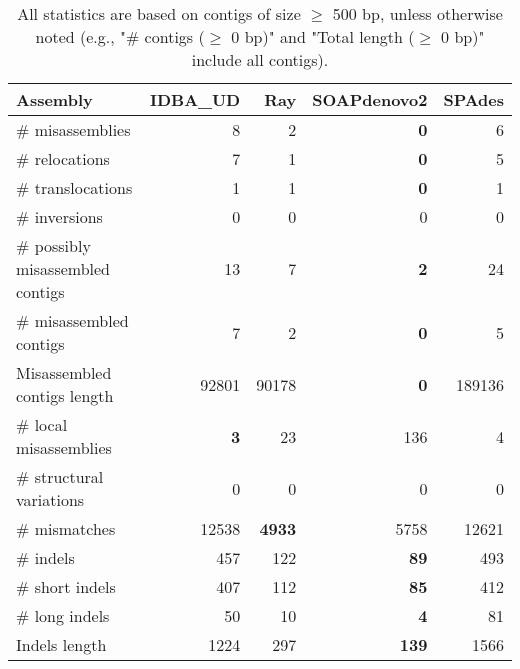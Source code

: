 \documentclass[12pt,a4paper]{article}
\begin{document}
\begin{table}[ht]
\begin{center}
\caption{All statistics are based on contigs of size $\geq$ 500 bp, unless otherwise noted (e.g., "\# contigs ($\geq$ 0 bp)" and "Total length ($\geq$ 0 bp)" include all contigs).}
\begin{tabular}{|l*{4}{|r}|}
\hline
Assembly & IDBA\_UD & Ray & SOAPdenovo2 & SPAdes \\ \hline
\# misassemblies & 8 & 2 & {\bf 0} & 6 \\ \hline
\hspace{5mm}\# relocations & 7 & 1 & {\bf 0} & 5 \\ \hline
\hspace{5mm}\# translocations & 1 & 1 & {\bf 0} & 1 \\ \hline
\hspace{5mm}\# inversions & 0 & 0 & 0 & 0 \\ \hline
\# possibly misassembled contigs & 13 & 7 & {\bf 2} & 24 \\ \hline
\# misassembled contigs & 7 & 2 & {\bf 0} & 5 \\ \hline
Misassembled contigs length & 92801 & 90178 & {\bf 0} & 189136 \\ \hline
\# local misassemblies & {\bf 3} & 23 & 136 & 4 \\ \hline
\# structural variations & 0 & 0 & 0 & 0 \\ \hline
\# mismatches & 12538 & {\bf 4933} & 5758 & 12621 \\ \hline
\# indels & 457 & 122 & {\bf 89} & 493 \\ \hline
\hspace{5mm}\# short indels & 407 & 112 & {\bf 85} & 412 \\ \hline
\hspace{5mm}\# long indels & 50 & 10 & {\bf 4} & 81 \\ \hline
Indels length & 1224 & 297 & {\bf 139} & 1566 \\ \hline
\end{tabular}
\end{center}
\end{table}
\end{document}
